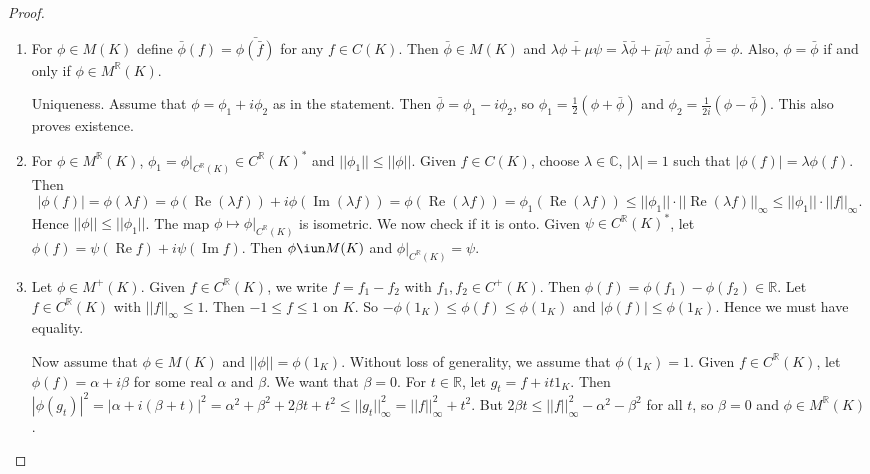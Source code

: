 \begin{proof}
  \begin{enumerate}
    \item For $\phi\in M(K)$ define $\bar\phi(f)=\bar{\phi(\bar f)}$
    for any $f\in C(K)$.
    Then $\bar \phi\in M(K)$
    and $\bar {\lambda \phi+\mu\psi}=\bar\lambda\bar\phi+\bar\mu\bar\psi$
    and $\bar{\bar \phi}=\phi$.
    Also,
    $\phi=\bar\phi$ if and only if $\phi\in M^\mathbb{R}(K)$.

    Uniqueness. Assume that $\phi=\phi_1+i\phi_2$ as in the statement.
    Then $\bar\phi=\phi_1-i\phi_2$,
    so $\phi_1=\frac{1}{2}(\phi+\bar\phi)$
    and $\phi_2=\frac{1}{2i}(\phi-\bar\phi)$.
    This also proves existence.

    \item For $\phi\in M^\mathbb{R}(K)$, $\phi_1=\phi|_{C^\mathbb{R}(K)}\in C^\mathbb{R}(K)^*$
    and $||\phi_1||\leq ||\phi||$.
    Given $f\in C(K)$, choose $\lambda\in \mathbb{C}$, $|\lambda|=1$ such that
    $|\phi(f)|=\lambda\phi(f)$.
    Then
    $$|\phi(f)|=\phi(\lambda f)=
    \phi(\operatorname{Re}(\lambda f))+i\phi(\operatorname{Im}(\lambda f))
    =\phi(\operatorname{Re}(\lambda f))=\phi_1(\operatorname{Re}(\lambda f))
    \leq ||\phi_1|| \cdot ||\operatorname{Re} (\lambda f)||_\infty
    \leq ||\phi_1|| \cdot ||f||_\infty.
    $$
    Hence $||\phi||\leq||\phi_1||$.
    The map $\phi\mapsto \phi|_{C^\mathbb{R}(K)}$ is isometric.
    We now check if it is onto.
    Given $\psi\in C^\mathbb{R}(K)^*$,
    let $\phi(f)=\psi(\operatorname{Re} f)+i\psi (\operatorname{Im}f)$.
    Then $\phi\iun M(K)$ and $\phi|_{C^\mathbb{R}(K)}=\psi$.

    \item Let $\phi\in M^+(K)$. Given $f\in C^\mathbb{R}(K)$,
    we write $f=f_1-f_2$ with $f_1,f_2\in C^+(K)$.
    Then $\phi(f)=\phi(f_1)-\phi(f_2)\in\mathbb{R}$.
    Let $f\in C^\mathbb{R}(K)$ with $||f||_\infty\leq 1$.
    Then $-1\leq f\leq 1$ on $K$.
    So $-\phi(1_K)\leq \phi(f)\leq \phi(1_K)$
    and $|\phi(f)|\leq \phi(1_K)$.
    Hence we must have equality.

    Now assume that $\phi\in M(K)$ and $||\phi||=\phi(1_K)$.
    Without loss of generality, we assume that $\phi(1_K)=1$.
    Given $f\in C^\mathbb{R}(K)$, let $\phi(f)=\alpha+i\beta$ for some real $\alpha$ and $\beta$.
    We want that $\beta=0$.
    For $t\in\mathbb{R}$, let $g_t=f+it1_K$.
    Then $|\phi(g_t)|^2=|\alpha+i(\beta+t)|^2=\alpha^2+\beta^2+2\beta t+t^2\leq ||g_t||_\infty^2=||f||_\infty^2+t^2$.
    But $2\beta t\leq ||f||_\infty^2-\alpha^2-\beta^2$ for all $t$, so $\beta=0$
    and $\phi\in M^\mathbb{R}(K)$.


\end{enumerate}
\end{proof}
